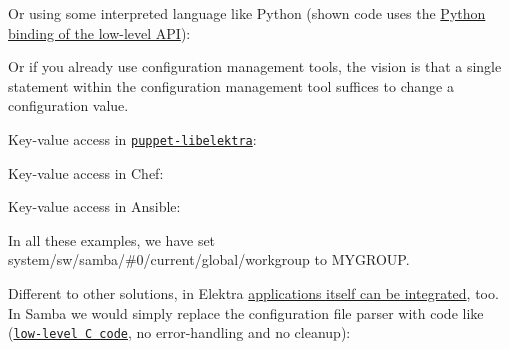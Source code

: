 Or using some interpreted language like Python (shown code uses the \hyperlink{doc_tutorials_python-kdb_md}{Python binding of the low-\/level A\+PI})\+:




Or if you already use configuration management tools, the vision is that a single statement within the configuration management tool suffices to change a configuration value.

Key-\/value access in \href{https://puppet.libelektra.org}{\tt puppet-\/libelektra}\+:




Key-\/value access in Chef\+:




Key-\/value access in Ansible\+:




In all these examples, we have set {\ttfamily system/sw/samba/\#0/current/global/workgroup} to {\ttfamily M\+Y\+G\+R\+O\+UP}.

Different to other solutions, in Elektra \hyperlink{doc_tutorials_application-integration_md}{applications itself can be integrated}, too. In Samba we would simply replace the configuration file parser with code like (\href{https://doc.libelektra.org/api/current/html/group__key.html}{\tt low-\/level C code}, no error-\/handling and no cleanup)\+:


